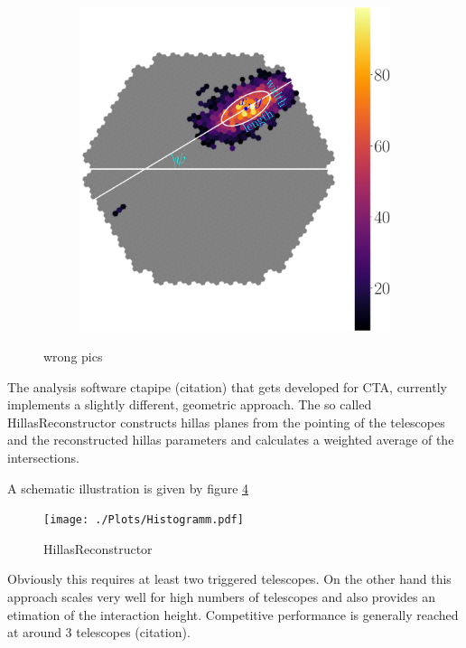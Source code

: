 \begin{figure}
\begin{subfigure}{0.3\textwidth}
        \label{fig:2}
    \end{subfigure}
    \begin{subfigure}{0.3\textwidth}
        \includegraphics[width=0.9\linewidth]{../Plots/hillas_cleaned_params.pdf} 
        \label{fig:1}
    \end{subfigure}
    \caption{wrong pics}
    \label{fig:disp_magic}
\end{figure}



The analysis software ctapipe (citation) that gets developed for
CTA, currently implements a slightly different, geometric approach.
The so called HillasReconstructor constructs hillas planes
from the pointing of the telescopes and the reconstructed hillas parameters
and calculates a weighted average of the intersections.

A schematic illustration is given by figure \ref{fig:hillas_reco}

\begin{figure}
    \centering
    \texttt{[image: ./Plots/Histogramm.pdf]}
    \caption{HillasReconstructor}
    \label{fig:hillas_reco}
\end{figure}

Obviously this requires at least two triggered telescopes.
On the other hand this approach scales
very well for high numbers of telescopes and
also provides an etimation of the interaction height.
Competitive performance is generally reached
at around 3 telescopes (citation).


